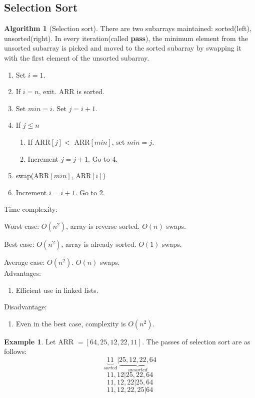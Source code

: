 \documentclass[10pt, a4paper]{extarticle}
\theoremstyle{definition}
\newtheorem{alg}{Algorithm}
\newtheorem{eg}{Example}
\begin{document}
	\subsection{Selection Sort}
\begin{alg}[Selection sort]
		There are two subarrays maintained: sorted(left), unsorted(right). In every iteration(called \textbf{pass}), the minimum element from the unsorted subarray is picked and moved to the sorted subarray by swapping it with the first element of the unsorted subarray.
		\begin{enumerate}
			\item Set $i=1$.
			\item If $i= n$, exit. ARR is sorted.
			\item Set $min=i$. Set $j=i+1$.
			\item If $j\leq n$
				\begin{enumerate}
					\item If ARR$[j]<$ ARR$[min]$, set $min=j$.
					\item Increment $j=j+1$. Go to 4.
			\end{enumerate}
			\item swap(ARR$[min]$, ARR$[i]$)
			\item Increment $i=i+1$. Go to 2.

			
	\end{enumerate}
		Time complexity:

		Worst case: $O(n^2)$, array is reverse sorted. $O(n)$ swaps.

		Best case: $O(n^2)$, array is already sorted. $O(1)$ swaps.

		Average case: $O(n^2)$. $O(n)$ swaps.
		\hfill\\
		Advantages:
		\begin{enumerate}
			\item Efficient use in linked lists.
	\end{enumerate}
	Disadvantage:
	\begin{enumerate}
		\item Even in the best case, complexity is $O(n^2)$.
\end{enumerate}
	\end{alg}

	\begin{eg}
		Let ARR $=[64,25,12,22,11]$. The passes of selection sort are as follows:
		\[\underbrace{11}_{sorted}|\underbrace{25,12,22,64}_{unsorted}\]
		\[11,12|25,22,64\]
		\[11,12,22|25,64\]
		\[11,12,22,25|64\tag*{(sorted)}\]
	\end{eg}
\end{document}
